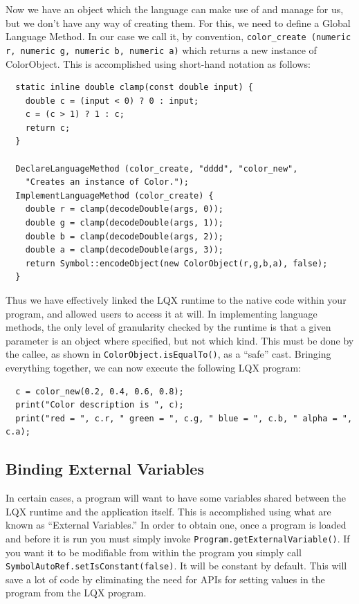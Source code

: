 \documentclass[]{article}
\newcommand{\ModLang}{LQX }
\begin{document}
  Now we have an object which the language can make use of and manage for us, but
  we don't have any way of creating them. For this, we need to define a Global Language
  Method. In our case we call it, by convention, {\tt color\_create (numeric r,
  numeric g, numeric b, numeric a)} which returns a new instance of ColorObject. This
  is accomplished using short-hand notation as follows:
  
  \lstset{language=C++}
  \begin{lstlisting}
  static inline double clamp(const double input) {
    double c = (input < 0) ? 0 : input;
    c = (c > 1) ? 1 : c;
    return c;
  }
  
  DeclareLanguageMethod (color_create, "dddd", "color_new", 
    "Creates an instance of Color.");
  ImplementLanguageMethod (color_create) {
    double r = clamp(decodeDouble(args, 0));
    double g = clamp(decodeDouble(args, 1));
    double b = clamp(decodeDouble(args, 2));
    double a = clamp(decodeDouble(args, 3));
    return Symbol::encodeObject(new ColorObject(r,g,b,a), false);
  }
  \end{lstlisting}
  
  Thus we have effectively linked the \ModLang runtime to the native code within
  your program, and allowed users to access it at will. In implementing language methods,
  the only level of granularity checked by the runtime is that a given parameter is an
  object where specified, but not which kind. This must be done by the callee, as shown
  in {\tt ColorObject.isEqualTo()}, as a ``safe'' cast. Bringing everything together,
  we can now execute the following \ModLang program:
  
  \lstset{language=C++}
  \begin{lstlisting}
  c = color_new(0.2, 0.4, 0.6, 0.8);
  print("Color description is ", c);
  print("red = ", c.r, " green = ", c.g, " blue = ", c.b, " alpha = ", c.a);
  \end{lstlisting}
  
  \subsection{Binding External Variables}
  
  In certain cases, a program will want to have some variables shared between the
  \ModLang runtime and the application itself. This is accomplished using what are known
  as ``External Variables.'' In order to obtain one, once a program is loaded and 
  before it is run you must simply invoke {\tt Program.getExternalVariable()}. If 
  you want it to be modifiable from within the program you simply call
  {\tt SymbolAutoRef.setIsConstant(false)}. It will be constant by default.
  This will save a lot of code by eliminating the need for APIs for setting
  values in the program from the \ModLang program.
  
\end{document}
